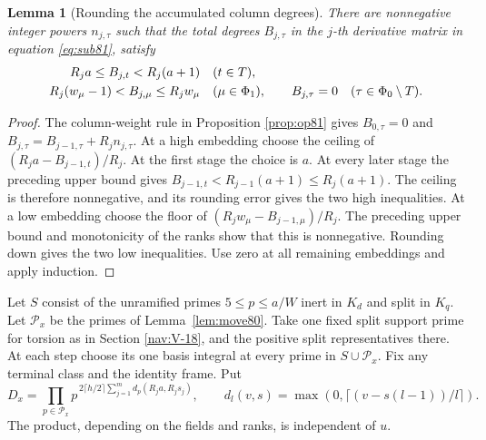 \documentclass[a4paper,11pt]{article}
\newtheorem{lemma}[proposition]{Lemma}
\theoremstyle{definition}
\theoremstyle{remark}
\numberwithin{equation}{section}
\begin{document}
\begin{lemma}[Rounding the accumulated column degrees]\label{lem:balance82}
There are nonnegative integer powers \(n_{j,\tau}\) such that the
total degrees \(B_{j,\tau}\) in the \(j\)-th derivative matrix
in equation \ref{eq:sub81}, satisfy
\begin{align}
 R_j a\le B_{j,t}<R_j(a+1) &\quad (t\in T),\notag\\
 R_j(w_\mu-1)<B_{j,\mu}\le R_jw_\mu &\quad(\mu\in\Phi_1),\qquad
 B_{j,\tau}=0\quad(\tau\in\Phi_0\setminus T).             \label{eq:balance82}
\end{align}
\end{lemma}
\begin{proof}
The column-weight rule in
Proposition \ref{prop:op81}
gives \(B_{0,\tau}=0\) and
\(B_{j,\tau}=B_{j-1,\tau}+R_j n_{j,\tau}\).
At a high embedding choose the ceiling of
\((R_j a-B_{j-1,t})/R_j\). At the first stage the choice is \(a\).
At every later stage the preceding upper bound gives
\(B_{j-1,t}< R_{j-1}(a+1)\le R_j(a+1)\). The ceiling is
therefore nonnegative, and its rounding error gives the two
high inequalities. At a low embedding choose the floor of
\((R_jw_\mu-B_{j-1,\mu})/R_j\). The preceding upper bound
and monotonicity of the ranks show that this is nonnegative.
Rounding down gives the two low inequalities. Use zero at all
remaining embeddings and apply induction.
\end{proof}

Let \(S\) consist of the unramified primes \(5\le p\le a/W\)
inert in \(K_d\) and split in \(K_q\). Let \(\mathcal P_x\)
be the primes of Lemma~\ref{lem:move80}. Take one fixed split
support prime for torsion as in Section \ref{nav:V-18}, and the
positive split representatives there. At each step choose its
one basis integral at every prime in \(S\cup\mathcal P_x\).
Fix any terminal class and the identity frame. Put
\[
 D_x=\prod_{p\in\mathcal P_x}
       p^{\,2\lceil h/2\rceil\sum_{j=1}^m d_p(R_j a,R_j s_j)},
 \qquad d_l(v,s)=\max(0,\lceil(v-s(l-1))/l\rceil).
\]
The product, depending on the fields and ranks, is independent of \(u\).
\end{document}
